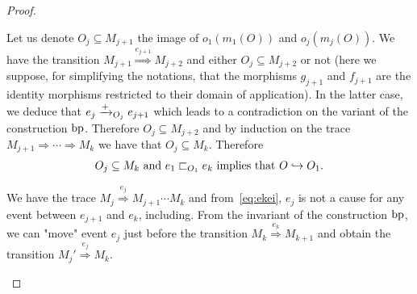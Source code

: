 \begin{proof}
\begin{itemize}
    Let us denote $O_j\subseteq M_{j+1}$ the image of $o_1(m_1(O))$ and $o_j(m_j(O))$.
    We have the transition $M_{j+1}\overset{e_{j+1}}{\Rightarrow} M_{j+2}$ and either $O_j\subseteq M_{j+2}$ or not (here we suppose, for simplifying the notations, that the morphisms $g_{j+1}$ and $f_{j+1}$ are the identity morphisms restricted to their domain of application). In the latter case, we deduce that $e_j\mathrel{\xrightarrow{+}}_{O_j} e_{j+1}$ which leads to a contradiction on the variant of the construction $\operatorname{bp}$. Therefore $O_j\subseteq M_{j+2}$ and by induction on the trace $M_{j+1}\Rightarrow \cdots \Rightarrow M_k$ we have that $O_j\subseteq M_k$. Therefore
    \begin{align}
      \label{eq:e1ek}
      O_j\subseteq M_k\text{ and }e_1\sqsubset_{O_1} e_k\text{ implies that }O\hookrightarrow O_1.
    \end{align}

    We have the trace $M_j\overset{e_j}{\Rightarrow} M_{j+1}\cdots M_k$ and from~\autoref{eq:ekei}, $e_j$ is not a cause for any event between $e_{j+1}$ and $e_k$, including. From the invariant of the construction $\operatorname{bp}$, we can "move" event $e_j$ just before the transition $M_k\overset{e_k}{\Rightarrow} M_{k+1}$ and obtain the transition $M_{j}'\overset{e_j}{\Rightarrow} M_k$.





  \end{itemize}

\end{proof}

